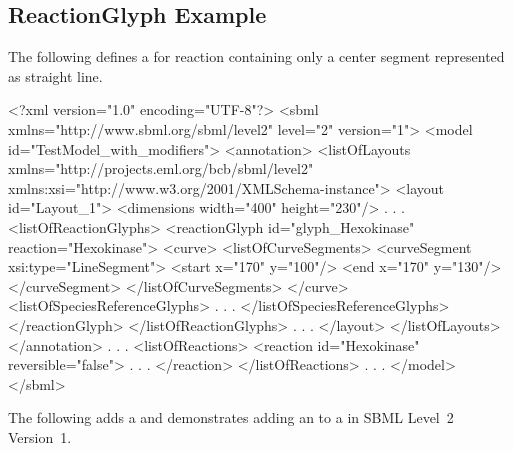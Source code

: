 \subsection{ReactionGlyph Example}
The following defines a \ReactionGlyph for reaction  
containing only a center segment represented as straight line. 

\label{example:reactionglyph}
\begin{example}
<?xml version="1.0" encoding="UTF-8"?>
<sbml xmlns="http://www.sbml.org/sbml/level2" level="2" version="1">
  <model id="TestModel_with_modifiers">
    <annotation>
     <listOfLayouts xmlns="http://projects.eml.org/bcb/sbml/level2"
              xmlns:xsi="http://www.w3.org/2001/XMLSchema-instance">
      <layout id="Layout_1">
        <dimensions width="400" height="230"/>
              .
              .
              .
        <listOfReactionGlyphs>
          <reactionGlyph id="glyph_Hexokinase" reaction="Hexokinase">
            <curve>
              <listOfCurveSegments>
                <curveSegment xsi:type="LineSegment">
                  <start x="170" y="100"/>
                  <end x="170" y="130"/>
                </curveSegment>
              </listOfCurveSegments>
            </curve>
            <listOfSpeciesReferenceGlyphs>
                    .
                    .
                    .
            </listOfSpeciesReferenceGlyphs>
          </reactionGlyph>
        </listOfReactionGlyphs>
             .
             .
             .
      </layout>
     </listOfLayouts>
    </annotation>
          .
          .
          .
    <listOfReactions>
      <reaction id="Hexokinase" reversible="false">
                    .
                    .
                    .
      </reaction>
    </listOfReactions>  
        .
        .
        .    
  </model>
</sbml>
\end{example}

The following adds a \SpeciesReferenceGlyph and demonstrates adding an 
 to a \SpeciesReference in SBML Level~2 Version~1. 


